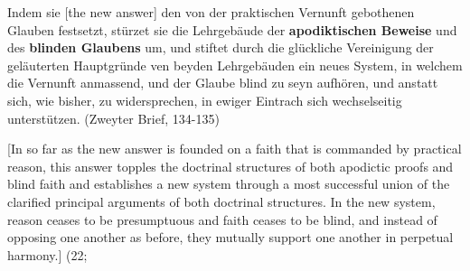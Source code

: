 Indem sie [the new answer] den von der praktischen Vernunft gebothenen Glauben festsetzt, st\"{u}rzet sie die Lehrgeb\"{a}ude der \textbf{apodiktischen Beweise} und des \textbf{blinden Glaubens} um, und stiftet durch die gl\"{u}ckliche Vereinigung der gel\"{a}uterten Hauptgr\"{u}nde ven beyden Lehrgeb\"{a}uden ein neues System, in welchem die Vernunft anmassend, und der Glaube blind zu seyn aufh\"{o}ren, und anstatt sich, wie bisher, zu widersprechen, in ewiger Eintrach sich wechselseitig unterst\"{u}tzen. (Zweyter Brief, 134{-}135)

[In so far as the new answer is founded on a faith that is commanded by practical reason, this answer topples the doctrinal structures of both apodictic proofs and blind faith and establishes a new system through a most successful union of the clarified principal arguments of both doctrinal structures. In the new system, reason ceases to be presumptuous and faith ceases to be blind, and instead of opposing one another as before, they mutually support one another in perpetual harmony.] (22;

